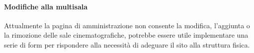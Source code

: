 \paragraph{Modifiche alla multisala} Attualmente la pagina di amministrazione non consente la modifica, l'aggiunta o la rimozione delle sale cinematografiche, potrebbe essere utile implementare una serie di form per rispondere alla necessità di adeguare il sito alla struttura fisica.